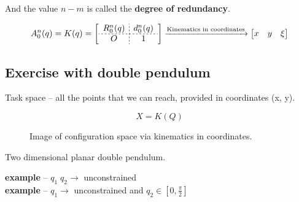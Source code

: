 \documentclass[12pt, a4paper]{extarticle}
\begin{document}
	And the value $n-m$ is called the \textbf{degree of redundancy}.


	\begin{equation}\label{key}
		A^n_0(q) = K(q) = \left[
		\begin{array}{c;{2pt/2pt}c}
			R^n_0(q) & d^n_0(q) \\ \hdashline[2pt/2pt]
			O & 1
		\end{array}
		\right] \xrightarrow{\text{Kinematics in coordinates}}
		\begin{bmatrix}
			x & y & \xi \\
		\end{bmatrix}
  	\end{equation}

	\subsection{Exercise with double pendulum}

	Task space -- all the points that we can reach, provided in coordinates (x, y). \\
	\begin{figure}
		\begin{equation}
			X = K(Q)
		\end{equation}
		\captionsetup{labelformat=empty}
		\caption{Image of configuration space via kinematics in coordinates.}
	\end{figure}
	Two dimensional planar double pendulum.

	\textbf{ example} -- $q_1\; q_2 \rightarrow$ unconstrained  \\
	\textbf{ example} -- $q_1 \rightarrow$ unconstrained and $q_2 \in [0, \tfrac{\pi}{2}]$



 
\end{document}
